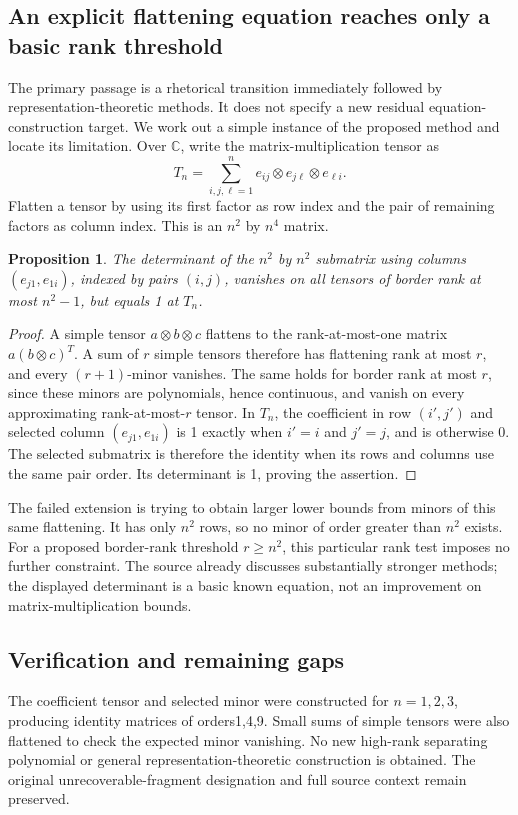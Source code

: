 \documentclass[11pt]{article}
\newtheorem{proposition}{Proposition}
\begin{document}
\subsection{An explicit flattening equation reaches only a basic rank threshold}
The primary passage is a rhetorical transition immediately followed by representation-theoretic methods. It does not specify a new residual equation-construction target. We work out a simple instance of the proposed method and locate its limitation. Over $\mathbb C$, write the matrix-multiplication tensor as
\[
T_n=\sum_{i,j,\ell=1}^n e_{ij}\otimes e_{j\ell}\otimes e_{\ell i}.
\]
Flatten a tensor by using its first factor as row index and the pair of remaining factors as column index. This is an $n^2$ by $n^4$ matrix.
\begin{proposition}
The determinant of the $n^2$ by $n^2$ submatrix using columns $(e_{j1},e_{1i})$, indexed by pairs $(i,j)$, vanishes on all tensors of border rank at most $n^2-1$, but equals 1 at $T_n$.
\end{proposition}
\begin{proof}
A simple tensor $a\otimes b\otimes c$ flattens to the rank-at-most-one matrix $a(b\otimes c)^T$. A sum of $r$ simple tensors therefore has flattening rank at most $r$, and every $(r+1)$-minor vanishes. The same holds for border rank at most $r$, since these minors are polynomials, hence continuous, and vanish on every approximating rank-at-most-$r$ tensor.
In $T_n$, the coefficient in row $(i',j')$ and selected column $(e_{j1},e_{1i})$ is 1 exactly when $i'=i$ and $j'=j$, and is otherwise 0. The selected submatrix is therefore the identity when its rows and columns use the same pair order. Its determinant is 1, proving the assertion.
\end{proof}
The failed extension is trying to obtain larger lower bounds from minors of this same flattening. It has only $n^2$ rows, so no minor of order greater than $n^2$ exists. For a proposed border-rank threshold $r\ge n^2$, this particular rank test imposes no further constraint. The source already discusses substantially stronger methods; the displayed determinant is a basic known equation, not an improvement on matrix-multiplication bounds.
\subsection{Verification and remaining gaps}
The coefficient tensor and selected minor were constructed for $n=1,2,3$, producing identity matrices of orders1,4,9. Small sums of simple tensors were also flattened to check the expected minor vanishing. No new high-rank separating polynomial or general representation-theoretic construction is obtained. The original unrecoverable-fragment designation and full source context remain preserved.
\end{document}
